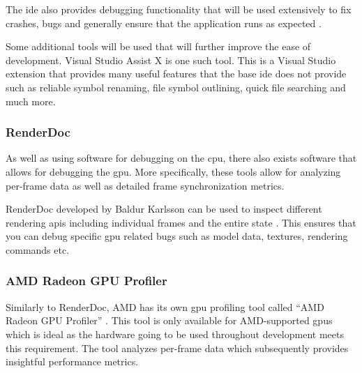 \documentclass[11pt]{article}
\begin{document}
The \gls{ide} also provides debugging functionality that will be used
extensively to fix crashes, bugs and generally ensure that the application
runs as expected \cite{visualstudio}. 


Some additional tools will be used that will further improve the ease of
development.  Visual Studio Assist X \cite{visualstudioassistx} is one such
tool. This is a Visual Studio extension that provides many useful features that
the base \gls{ide} does not provide such as reliable symbol renaming, file symbol
outlining, quick file searching and much more.


\subsubsection{RenderDoc}
As well as using software for debugging on the \gls{cpu}, there also exists
software that allows for debugging the \gls{gpu}. More specifically, these tools
allow for analyzing per-frame data as well as detailed frame synchronization
metrics.

RenderDoc developed by Baldur Karlsson can be used to inspect different
rendering \glspl{api} including individual frames and the entire state
\cite{renderdoc}. This ensures that you can debug specific \gls{gpu} related
bugs such as model data, textures, rendering commands etc.


\subsubsection{AMD Radeon GPU Profiler}
Similarly to RenderDoc, AMD has its own \gls{gpu} profiling tool called ``AMD
Radeon GPU Profiler'' \cite{rgp}. This tool is only available for AMD-supported
\glspl{gpu} which is ideal as the hardware going to be used throughout
development meets this requirement. The tool analyzes per-frame data which
subsequently provides insightful performance metrics.

\end{document}
